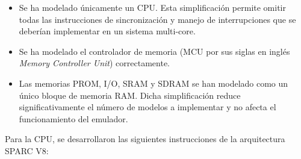 \begin{itemize}
\item Se ha modelado únicamente un CPU. Esta simplificación permite omitir todas las instrucciones de sincronización y manejo de interrupciones que se deberían implementar en un sistema multi-core.
\item Se ha modelado el controlador de memoria (MCU por sus siglas en inglés \textit{Memory Controller Unit}) correctamente.
\item Las memorias PROM, I/O, SRAM y SDRAM se han modelado como un único bloque de memoria RAM. Dicha simplificación reduce significativamente el número de modelos a implementar y no afecta el funcionamiento del emulador.
\end{itemize}


Para la CPU, se desarrollaron las siguientes instrucciones de la arquitectura SPARC V8:

